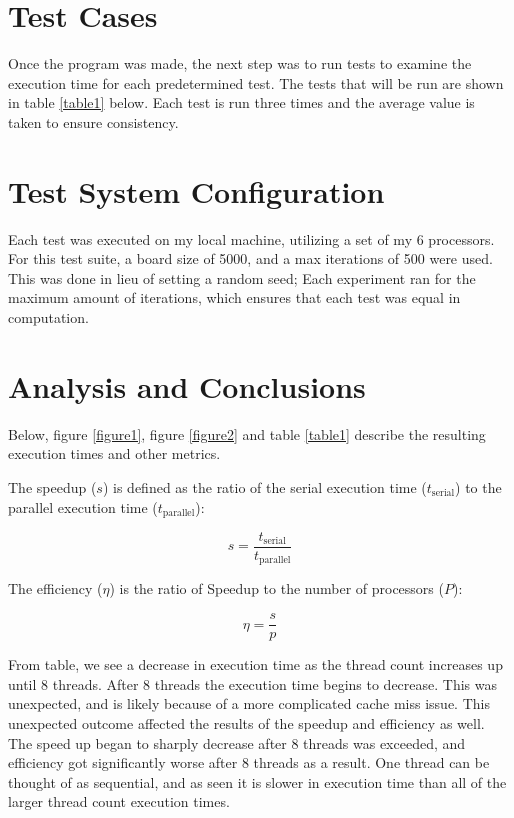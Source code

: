 \documentclass{article}
\begin{document}
	\section{Test Cases}
	Once the program was made, the next step was to run tests to examine the execution time for each predetermined test. The tests that will be run are shown in table \ref{table1} below. Each test is run three times and the average value is taken to ensure consistency.

	\section{Test System Configuration}
	Each test was executed on my local machine, utilizing a set of my 6 processors. For this test suite, a board size of 5000, and a max iterations of 500 were used. This was done in lieu of setting a random seed; Each experiment ran for the maximum amount of iterations, which ensures that each test was equal in computation.

	\section{Analysis and Conclusions}
	Below, figure \ref{figure1}, figure \ref{figure2} and table \ref{table1} describe the resulting execution times and other metrics.
	
	The speedup (\(s\)) is defined as the ratio of the serial execution time (\(t_{\text{serial}}\)) to the parallel execution time (\(t_{\text{parallel}}\)):

\[s = \frac{t_{\text{serial}}}{t_{\text{parallel}}}\]

The efficiency (\(\eta\)) is the ratio of Speedup to the number of processors (\(P\)):

\[\eta = \frac{s}{p}\]

From table, we see a decrease in execution time as the thread count increases up until 8 threads. After 8 threads the execution time begins to decrease. This was unexpected, and is likely because of a more complicated cache miss issue. This unexpected outcome affected the results of the speedup and efficiency as well. The speed up began to sharply decrease after 8 threads was exceeded, and efficiency got significantly worse after 8 threads as a result. One thread can be thought of as sequential, and as seen it is slower in execution time than all of the larger thread count execution times.
	
\end{document}
